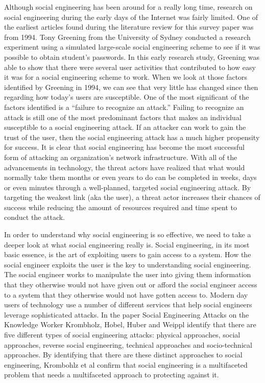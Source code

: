 \documentclass[conference]{IEEEtran}
\begin{document}
Although social engineering has been around for a really long time, research on social engineering during the early days of the Internet was fairly limited.  One of the earliest articles found during the literature review for this survey paper was from 1994. Tony Greening from the University of Sydney conducted a research experiment using a simulated large-scale social engineering scheme to see if it was possible to obtain student’s passwords\cite{Greening:1996:AYS:228292.228295}. In this early research study, Greening was able to show that there were several user activities that contributed to how easy it was for a social engineering scheme to work.  When we look at those factors identified by Greening in 1994, we can see that very little has changed since then regarding how today’s users are susceptible. One of the most significant of the factors identified is a “failure to recognize an attack.” Failing to recognize an attack is still one of the most predominant factors that makes an individual susceptible to a social engineering attack.  If an attacker can work to gain the trust of the user, then the social engineering attack has a much higher propensity for success. 
It is clear that social engineering has become the most successful form of attacking an organization’s network infrastructure.  With all of the advancements in technology, the threat actors have realized that what would normally take them months or even years to do can be completed in weeks, days or even minutes through a well-planned, targeted social engineering attack. By targeting the weakest link (aka the user), a threat actor increases their chances of success while reducing the amount of resources required and time spent to conduct the attack. 

In order to understand why social engineering is so effective, we need to take a deeper look at what social engineering really is. Social engineering, in its most basic essence, is the art of exploiting users to gain access to a system\cite{Krombholz:2013:SEA:2523514.2523596}.  How the social engineer exploits the user is the key to understanding social engineering. The social engineer works to manipulate the user into giving them information that they otherwise would not have given out or afford the social engineer access to a system that they otherwise would not have gotten access to. Modern day users of technology use a number of different services that help social engineers leverage sophisticated attacks\cite{Krombholz:2013:SEA:2523514.2523596}. In the paper Social Engineering Attacks on the Knowledge Worker Krombholz, Hobel, Huber and Weippl identify that there are five different types of social engineering attacks: physical approaches, social approaches, reverse social engineering, technical approaches and socio-technical approaches\cite{Krombholz:2013:SEA:2523514.2523596}. By identifying that there are these distinct approaches to social engineering, Krombohlz et al confirm that social engineering is a multifaceted problem that needs a multifaceted approach to protecting against it. 
\end{document}
